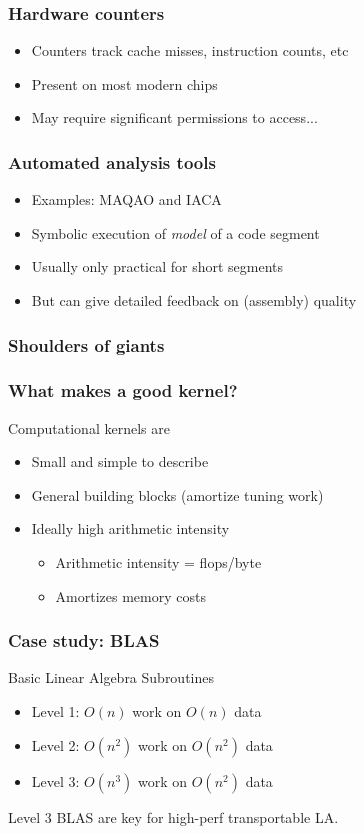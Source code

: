 \documentclass{beamer}
\begin{document}
\begin{frame}
  \frametitle{Hardware counters}

  \begin{itemize}
  \item Counters track cache misses, instruction counts, etc
  \item Present on most modern chips
  \item May require significant permissions to access...
  \end{itemize}
\end{frame}


\begin{frame}
  \frametitle{Automated analysis tools}

  \begin{itemize}
  \item Examples: MAQAO and IACA
  \item Symbolic execution of {\em model} of a code segment
  \item Usually only practical for short segments
  \item But can give detailed feedback on (assembly) quality
  \end{itemize}
\end{frame}




\begin{frame}
  \frametitle{Shoulders of giants}
\end{frame}


\begin{frame}
  \frametitle{What makes a good kernel?}

  Computational kernels are
  \begin{itemize}
  \item Small and simple to describe
  \item General building blocks (amortize tuning work)
  \item Ideally high arithmetic intensity
    \begin{itemize}
    \item Arithmetic intensity = flops/byte
    \item Amortizes memory costs
    \end{itemize}
  \end{itemize}
  
\end{frame}


\begin{frame}
  \frametitle{Case study: BLAS}

  Basic Linear Algebra Subroutines
  \begin{itemize}
  \item Level 1: $O(n)$ work on $O(n)$ data
  \item Level 2: $O(n^2)$ work on $O(n^2)$ data
  \item Level 3: $O(n^3)$ work on $O(n^2)$ data
  \end{itemize}
  Level 3 BLAS are key for high-perf transportable LA.
\end{frame}
\end{document}
